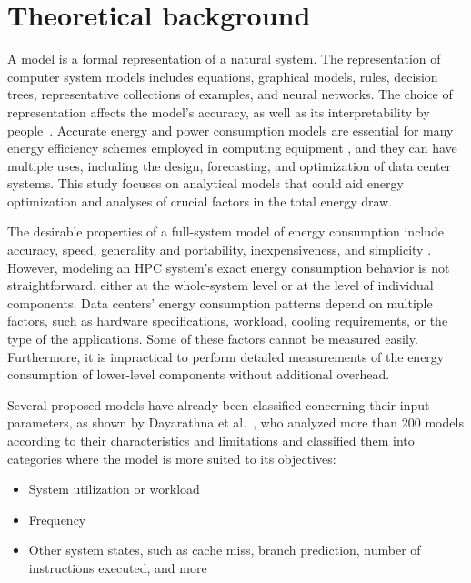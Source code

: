 
\section{Theoretical background} \label{sec:theoretical_background}

A model is a formal representation of a natural system. The representation of computer system models includes equations, graphical models, rules, decision trees, representative collections of examples, and neural networks. The choice of representation affects the model's accuracy, as well as its interpretability by people~\cite{Hypothesis2012EncyclopediaLearning, Roy2019ForecastingNetwork, Zhu2019PredictingLearning}. Accurate energy and power consumption models are essential for many energy efficiency schemes employed in computing equipment \cite{Rivoire2007ModelsOptimizations}, and they can have multiple uses, including the design, forecasting, and optimization of data center systems. This study focuses on analytical models that could aid energy optimization and analyses of crucial factors in the total energy draw.

The desirable properties of a full-system model of energy consumption include accuracy, speed, generality and portability, inexpensiveness, and simplicity \cite{Rivoire2008AModels}. However, modeling an HPC system's exact energy consumption behavior is not straightforward, either at the whole-system level or at the level of individual components. Data centers' energy consumption patterns depend on multiple factors, such as hardware specifications, workload, cooling requirements, or the type of the applications. Some of these factors cannot be measured easily. Furthermore, it is impractical to perform detailed measurements of the energy consumption of lower-level components without additional overhead.

Several proposed models have already been classified concerning their input parameters, as shown by Dayarathna et al.~\cite{Dayarathna2016DataSurvey}, who analyzed more than 200 models according to their characteristics and limitations and classified them into categories where the model is more suited to its objectives:
\begin{itemize}
	\item System utilization or workload
	\item Frequency
	\item Other system states, such as cache miss, branch prediction, number of instructions executed, and more
	\label{tab:input_type}
\end{itemize}

